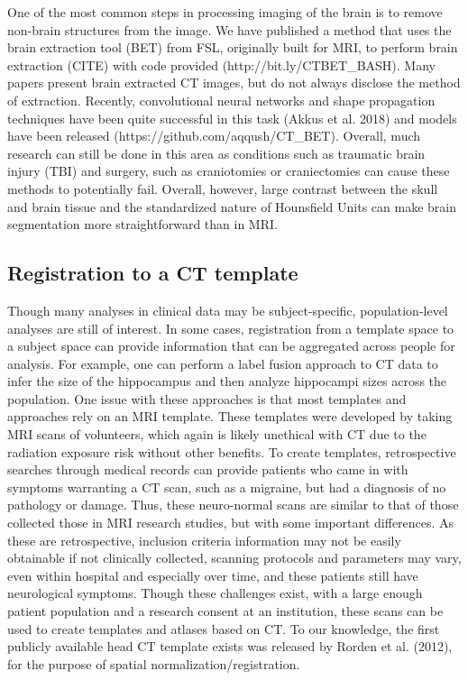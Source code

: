 \documentclass[]{elsarticle} %
\begin{document}
One of the most common steps in processing imaging of the brain is to remove non-brain structures from the image. We have published a method that uses the brain extraction tool (BET) from FSL, originally built for MRI, to perform brain extraction (CITE) with code provided (http://bit.ly/CTBET\_BASH). Many papers present brain extracted CT images, but do not always disclose the method of extraction. Recently, convolutional neural networks and shape propagation techniques have been quite successful in this task (Akkus et al. 2018) and models have been released (https://github.com/aqqush/CT\_BET). Overall, much research can still be done in this area as conditions such as traumatic brain injury (TBI) and surgery, such as craniotomies or craniectomies can cause these methods to potentially fail. Overall, however, large contrast between the skull and brain tissue and the standardized nature of Hounsfield Units can make brain segmentation more straightforward than in MRI.

\hypertarget{registration-to-a-ct-template}{%
\subsection{Registration to a CT template}\label{registration-to-a-ct-template}}

Though many analyses in clinical data may be subject-specific, population-level analyses are still of interest. In some cases, registration from a template space to a subject space can provide information that can be aggregated across people for analysis. For example, one can perform a label fusion approach to CT data to infer the size of the hippocampus and then analyze hippocampi sizes across the population. One issue with these approaches is that most templates and approaches rely on an MRI template. These templates were developed by taking MRI scans of volunteers, which again is likely unethical with CT due to the radiation exposure risk without other benefits. To create templates, retrospective searches through medical records can provide patients who came in with symptoms warranting a CT scan, such as a migraine, but had a diagnosis of no pathology or damage. Thus, these neuro-normal scans are similar to that of those collected those in MRI research studies, but with some important differences. As these are retrospective, inclusion criteria information may not be easily obtainable if not clinically collected, scanning protocols and parameters may vary, even within hospital and especially over time, and these patients still have neurological symptoms. Though these challenges exist, with a large enough patient population and a research consent at an institution, these scans can be used to create templates and atlases based on CT. To our knowledge, the first publicly available head CT template exists was released by Rorden et al. (2012), for the purpose of spatial normalization/registration.
\end{document}
